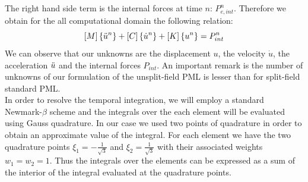 The right hand side term is the internal forces at time $n$: $P_{e,int}^n$. Therefore we obtain for the all computational domain the following relation:
\begin{equation}
    \left[M\right]\left\{\Ddot{u}^n\right\} + \left[C\right] \left\{\Dot{u}^n\right\}+ \left[K\right] \left\{u^n\right\} = P_{int}^n
\end{equation}
We can observe that our unknowns are the displacement $u$, the velocity $\Dot{u}$, the acceleration $\Ddot{u}$ and the internal forces $P_{int}$. An important remark is the number of unknowns of our formulation of the unsplit-field PML is lesser than for split-field standard PML.\\ 
In order to resolve the temporal integration, we will employ a standard Newmark-$\beta$ scheme and the integrals over the each element will be evaluated using Gauss quadrature. In our case we used two points of quadrature in order to obtain an approximate value of the integral. For each element we have the two quadrature points $\xi_1 =- \frac{1}{\sqrt{3}}$  and $\xi_2 = \frac{1}{\sqrt{3}}$ with their associated weights $w_1=w_2=1$. Thus the integrals over the elements can be expressed as a sum of the interior of the integral evaluated at the quadrature points. \\




